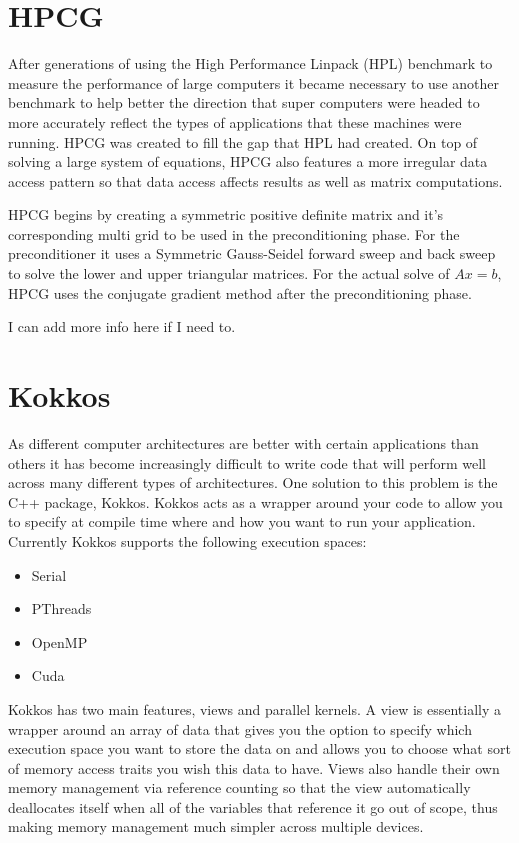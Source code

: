 \documentclass{ccr15}
\begin{document}
\section{HPCG}
After generations of using the High Performance Linpack (HPL) benchmark to measure the
performance of large computers it became necessary to use another benchmark to help better the 
direction that super computers were headed to more accurately reflect the types of applications
that these machines were running. HPCG was created to fill the gap that HPL had created. On top
of solving a large system of equations, HPCG also features a more irregular data access pattern
so that data access affects results as well as matrix computations.

HPCG begins by creating a symmetric positive definite matrix and it's corresponding multi grid 
to be used in the preconditioning phase. For the preconditioner it uses a Symmetric Gauss-Seidel 
forward sweep and back sweep to solve the lower and upper triangular matrices. For the actual
solve of $A x = b$, HPCG uses the conjugate gradient method after the preconditioning phase.

I can add more info here if I need to.

\section{Kokkos}
As different computer architectures are better with certain applications than others it has
become increasingly difficult to write code that will perform well across many different types of
architectures. One solution to this problem is the C++ package, Kokkos. Kokkos acts as a wrapper
around your code to allow you to specify at compile time where and how you want to run your
application. Currently Kokkos supports the following execution spaces:
\begin{itemize}
	\item Serial
	\item PThreads
	\item OpenMP
	\item Cuda
\end{itemize}

Kokkos has two main features, views and parallel kernels. A view is essentially a wrapper around
an array of data that gives you the option to specify which execution space you want to store the
data on and allows you to choose what sort of memory access traits you wish this data to have.
Views also handle their own memory management via reference counting so that the view
automatically deallocates itself when all of the variables that reference it go out of scope,
thus making memory management much simpler across multiple devices.
\end{document}

